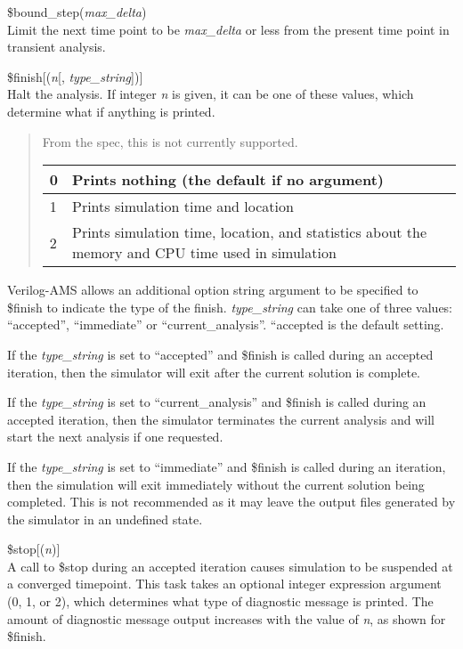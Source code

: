 \begin{description}
\item{\vt \$bound\_step}({\it max\_delta\/})\\
Limit the next time point to be {\it max\_delta} or less from the
present time point in transient analysis.

\item{\vt \$finish}[({\it n\/}[, {\it type\_string\/}])]\\
Halt the analysis.  If integer {\it n} is given, it can be one of
these values, which determine what if anything is printed.

\begin{quote}
From the spec, this is not currently supported.

\begin{tabular}{|l|p{4in}|} \hline
0 & Prints nothing (the default if no argument)\\ \hline
1 & Prints simulation time and location\\ \hline
2 & Prints simulation time, location, and statistics
  about the memory and CPU time used in simulation\\ \hline
\end{tabular}
\end{quote}

Verilog-AMS allows an additional option string argument to be
specified to {\vt \$finish} to indicate the type of the finish.  {\it
type\_string} can take one of three values:  ``{\vt accepted}'',
``{\vt immediate}'' or ``{\vt current\_analysis}''.  ``{\vt accepted}
is the default setting.

If the {\it type\_string} is set to ``{\vt accepted}'' and {\vt
\$finish} is called during an accepted iteration, then the simulator
will exit after the current solution is complete.

If the {\it type\_string} is set to ``{\vt current\_analysis}'' and
{\vt \$finish} is called during an accepted iteration, then the
simulator terminates the current analysis and will start the next
analysis if one requested. 

If the {\it type\_string} is set to ``{\vt immediate}'' and {\vt
\$finish} is called during an iteration, then the simulation will exit
immediately without the current solution being completed.  This is not
recommended as it may leave the output files generated by the
simulator in an undefined state.

\item{\vt \$stop}[({\it n\/})]\\
A call to {\vt \$stop} during an accepted iteration causes simulation
to be suspended at a converged timepoint.  This task takes an optional
integer expression argument (0, 1, or 2), which determines what type
of diagnostic message is printed.  The amount of diagnostic message
output increases with the value of {\it n\/}, as shown for {\vt
\$finish}.
\end{description}

